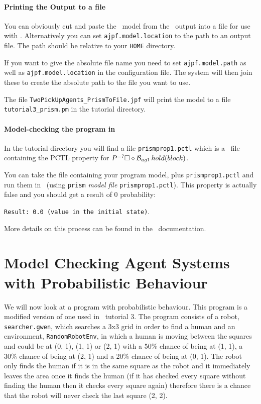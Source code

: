 \paragraph{Printing the Output to a file} You can obviously cut and paste the \prism\ model from the \ajpf\ output into a file for use with \prism.  Alternatively you can set \texttt{ajpf.model.location} to the path to an output file.  The path should be relative to your \texttt{HOME} directory.  

If you want to give the absolute file name you need to set \texttt{ajpf.model.path} as well as \texttt{ajpf.model.location} in the configuration file.  The system will then join these to create the absolute path to the file you want to use.

The file \texttt{TwoPickUpAgents\_PrismToFile.jpf} will print the model to a file \texttt{tutorial3\_prism.pm} in the tutorial directory.

\paragraph{Model-checking the program in \prism}  In the tutorial directory you will find a file \texttt{prismprop1.pctl} which is a \prism\ file containing the PCTL property for $P^{=?}\Box \diamond \mathrm{{\cal B}}_{ag1} \, hold(block)$. 

You can take the file containing  your program model, plus \texttt{prismprop1.pctl} and run them in \prism\ (using \texttt{prism} \emph{model file} \texttt{prismprop1.pctl}).  This property is actually false and you should get a result of 0 probability:

\texttt{Result: 0.0 (value in the initial state)}.

More details on this process can be found in the \prism\ documentation.

\section{Model Checking Agent Systems with Probabilistic Behaviour}

We will now look at a program with probabilistic behaviour.  This program is a modified version of one used in \ail\ tutorial 3. The program consists of a robot, \texttt{searcher.gwen}, which searches a 3x3 grid in order to find a human and an environment, \texttt{RandomRobotEnv}, in which a human is moving between the squares and could be at (0, 1), (1, 1) or (2, 1) with a 50\% chance of being at (1, 1), a 30\% chance of being at (2, 1) and a 20\% chance of being at (0, 1).  The robot only finds the human if it is in the same square as the robot and it immediately leaves the area once it finds the human (if it has checked every square without finding the human then it checks every square again) therefore there is a chance that the robot will never check the last square (2, 2).

